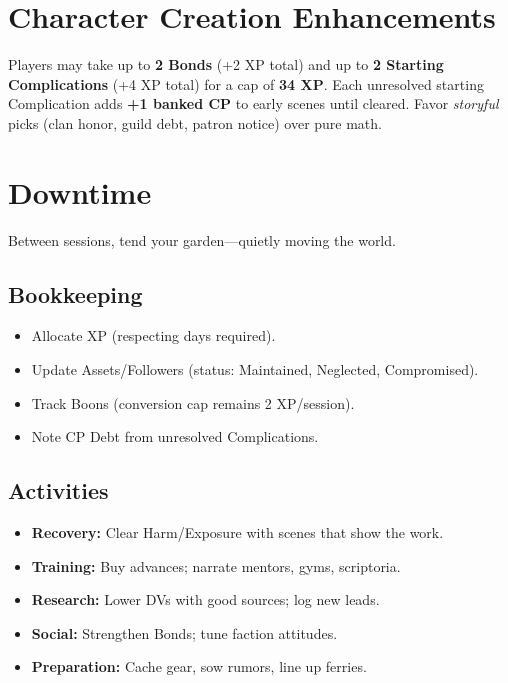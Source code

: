 \begin{multicols}{2}
\section{Character Creation Enhancements}

Players may take up to \textbf{2 Bonds} (+2 XP total) and up to \textbf{2 Starting Complications} (+4 XP total) for a cap of \textbf{34 XP}. Each unresolved starting Complication adds \textbf{+1 banked CP} to early scenes until cleared. Favor \emph{storyful} picks (clan honor, guild debt, patron notice) over pure math.

\section{Downtime}

Between sessions, tend your garden—quietly moving the world.

\subsection{Bookkeeping}
\begin{itemize}
  \item Allocate XP (respecting days required).%
  \item Update Assets/Followers (status: Maintained, Neglected, Compromised).%
  \item Track Boons (conversion cap remains 2 XP/session).%
  \item Note CP Debt from unresolved Complications.%
\end{itemize}

\subsection{Activities}
\begin{itemize}
  \item \textbf{Recovery:} Clear Harm/Exposure with scenes that show the work.%
  \item \textbf{Training:} Buy advances; narrate mentors, gyms, scriptoria.%
  \item \textbf{Research:} Lower DVs with good sources; log new leads.%
  \item \textbf{Social:} Strengthen Bonds; tune faction attitudes.%
  \item \textbf{Preparation:} Cache gear, sow rumors, line up ferries.%
\end{itemize}


\end{multicols}
